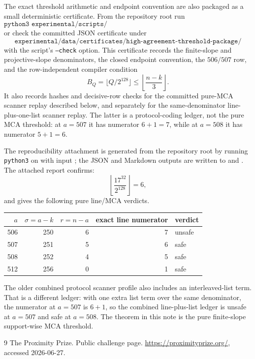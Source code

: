 \documentclass[11pt]{article}
\theoremstyle{remark}
\begin{document}
The exact threshold arithmetic and endpoint convention are also packaged as a
small deterministic certificate.  From the repository root run
\[
\texttt{python3 experimental/scripts/certify\_high\_agreement\_threshold\_package.py}
\]
or check the committed JSON certificate under
\[
\texttt{experimental/data/certificates/high-agreement-threshold-package/}
\]
with the script's \texttt{--check} option.  This certificate records the
finite-slope and projective-slope denominators, the closed endpoint convention,
the \(506/507\) row, and the row-independent compiler condition
\[
        B_Q=\lfloor Q/2^{128}\rfloor\le \left\lfloor\frac{n-k}{3}\right\rfloor .
\]
It also records hashes and decisive-row checks for the committed pure-MCA
scanner replay described below, and separately for the same-denominator
line-plus-one-list scanner replay.  The latter is a protocol-coding ledger, not
the pure MCA threshold: at \(a=507\) it has numerator \(6+1=7\), while at
\(a=508\) it has numerator \(5+1=6\).

The reproducibility attachment is generated from the repository root by running
\texttt{python3} on
 with input
;
the JSON and Markdown outputs are written to
and
.
The attached report confirms:
\[
  \left\lfloor\frac{17^{32}}{2^{128}}\right\rfloor=6,
\]
and gives the following pure line/MCA verdicts.

\begin{center}
\begin{tabular}{rrrrl}
\toprule
\(a\) & \(\sigma=a-k\) & \(r=n-a\) & exact line numerator & verdict\\
\midrule
506 & 250 & 6 & 7 & unsafe\\
507 & 251 & 5 & 6 & safe\\
508 & 252 & 4 & 5 & safe\\
512 & 256 & 0 & 1 & safe\\
\bottomrule
\end{tabular}
\end{center}

The older combined protocol scanner profile also includes an interleaved-list
term.  That is a different ledger: with one extra list term over the same
denominator, the numerator at \(a=507\) is \(6+1\), so the combined line-plus-list
ledger is unsafe at \(a=507\) and safe at \(a=508\).  The theorem in this note is
the pure finite-slope support-wise MCA threshold.

\begin{thebibliography}{9}
The Proximity Prize.
\newblock Public challenge page.
\newblock \url{https://proximityprize.org/}, accessed 2026-06-27.
\end{thebibliography}
\end{document}
